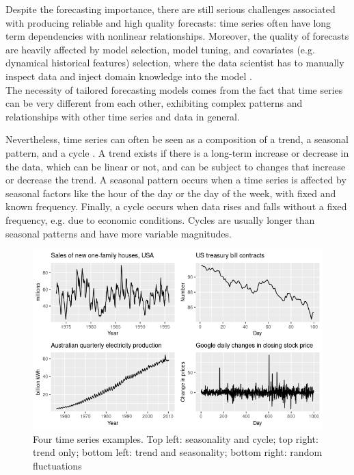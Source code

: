 \documentclass[a4paper]{article} %
\begin{document}
	Despite the forecasting importance, there are still serious challenges associated with producing reliable and high quality forecasts: time series often have long term dependencies with nonlinear relationships.  Moreover, the quality of forecasts are heavily affected by model selection, model tuning, and covariates (e.g. dynamical historical features) selection, where the data scientist has to manually inspect data and inject domain knowledge into the model \cite{DeepLearningForecastingSurvey, FacebookProphet}.\\
	The necessity of tailored forecasting models comes from the fact that time series can be very different from each other, exhibiting complex patterns and relationships with other time series and data in general. 
	
	Nevertheless, time series can often be seen as a composition of a trend, a seasonal pattern, and a cycle \cite{ForecastingHyndmanAthanasopoulos}.
	A trend exists if there is a long-term increase or decrease in the data, which can be linear or not, and can be subject to changes that increase or decrease the trend.
	A seasonal pattern occurs when a time series is affected by seasonal factors like the hour of the day or the day of the week, with fixed and known frequency.
	Finally, a cycle occurs when data rises and falls without a fixed frequency, e.g. due to economic conditions.  Cycles are usually longer than seasonal patterns and have more variable magnitudes.
	
	\begin{figure}
	\includegraphics[width=\linewidth]{img/sota_ts_components.png}
	\caption{Four time series examples. Top left: seasonality and cycle; top right: trend only; bottom left: trend and seasonality; bottom right: random fluctuations}
	\end{figure}
	
\end{document}
